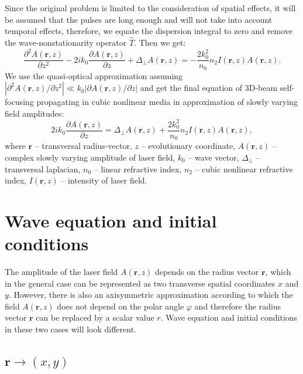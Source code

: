 \documentclass[a4paper, 12pt]{article}
\begin{document}
Since the original problem is limited to the consideration of spatial effects, it will be assumed that the pulses are long enough and will not take into account temporal effects, therefore, we equate the dispersion integral to zero and remove the wave-nonstationarity operator $\hat{T}$. Then we get:
\begin{equation}
\label{eqn:approx_final}
\frac{\partial^2 A (\mathbf{r}, z)}{\partial z^2} - 2 i k_0 \frac{\partial A (\mathbf{r}, z)}{\partial z} + \Delta_{\perp} A (\mathbf{r}, z)= - \frac{2 k_0^2}{n_0} n_2 I(\mathbf{r}, z) A(\mathbf{r}, z).
\end{equation}
We use the quasi-optical approximation assuming $| \partial^2 A(\mathbf{r}, z) / \partial z^2| \ll k_0 |\partial A(\mathbf{r},z) / \partial z|$ and get the final equation of 3D-beam self-focusing  propagating in cubic nonlinear media in approximation of slowly varying field amplitudes:
\begin{equation}
\label{eqn:final}
2 i k_0 \frac{\partial A (\mathbf{r}, z)}{\partial z} = \Delta_{\perp} A (\mathbf{r}, z) + \frac{2 k_0^2}{n_0} n_2 I(\mathbf{r}, z) A(\mathbf{r}, z),
\end{equation}
where $\mathbf{r}$ -- transversal radius-vector, $z$ -- evolutionary coordinate, $A(\mathbf{r},z)$ -- complex slowly varying amplitude of laser field, $k_0$ -- wave vector, $\Delta_\perp$ -- transversal laplacian, $n_0$ -- linear refractive index, $n_2$ -- cubic nonlinear refractive index, $I(\mathbf{r},z)$ -- intensity of laser field. 

\section{Wave equation and initial conditions}

The amplitude of the laser field $A(\mathbf{r},z)$ depends on the radius vector $\mathbf{r}$, which in the general case can be represented as two transverse spatial coordinates $x$ and $y$. However, there is also an axisymmetric approximation according to which the field $A(\mathbf{r},z)$ does not depend on the polar angle $\varphi$ and therefore the radius vector $\mathbf{r}$ can be replaced by a scalar value $r$. Wave equation and initial conditions in these two cases will look different.

\subsection{$\mathbf{r}\longrightarrow(x,y)$}
\end{document}
